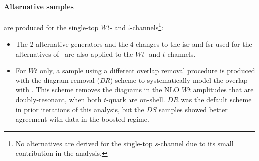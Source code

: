 \paragraph{Alternative samples} are produced for the single-top $Wt$- and $t$-channels\footnote{No alternatives are derived for the single-top $s$-channel due to its small contribution in the analysis.}:
\begin{itemize}
  \item The 2 alternative generators and the 4 changes to the \gls{isr} and \gls{fsr} used for the alternatives of \ttb\ are also applied to the $Wt$- and $t$-channels.
  \item For $Wt$ only, a sample using a different overlap removal procedure is produced with the diagram removal (\textit{DR}) scheme \cite{StefanoFrixione_2008} to systematically model the overlap with \ttb. This scheme removes the diagrams in the NLO $Wt$ amplitudes that are doubly-resonant, when both $t$-quark are on-shell. $DR$ was the default scheme in prior iterations of this analysis, but the $DS$ samples showed better agreement with data in the boosted regime.
\end{itemize}

